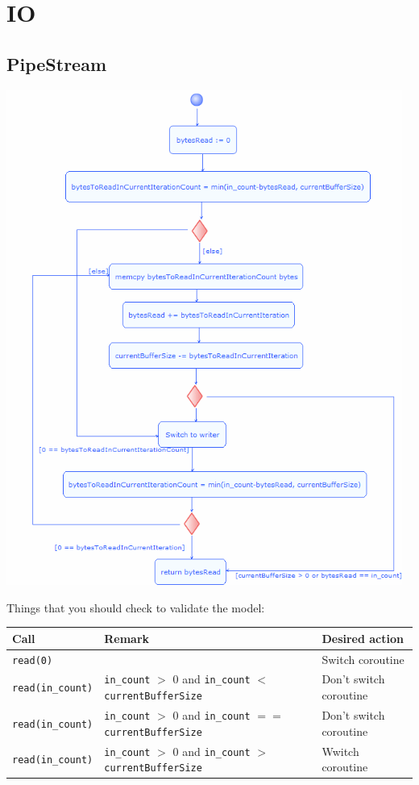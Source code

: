 \documentclass[10pt]{scrbook}
\begin{document}
\section{IO}

\subsection{PipeStream}

\includegraphics[width=130mm]{uml/PipeStream_read_activity.png}

Things that you should check to validate the model:

\begin{tabular}{| l | l | l |}
\hline
Call & Remark & Desired action \\
\hline
\hline
  \texttt{read(0)} & & Switch coroutine \\
\hline
  \texttt{read(in\_count)} & \texttt{in\_count} $>$ 0 and \texttt{in\_count} $<$ \texttt{currentBufferSize} & Don't switch coroutine \\
\hline
  \texttt{read(in\_count)} & \texttt{in\_count} $>$ 0 and \texttt{in\_count} $==$ \texttt{currentBufferSize} & Don't switch coroutine \\
\hline
  \texttt{read(in\_count)} & \texttt{in\_count} $>$ 0 and \texttt{in\_count} $>$ \texttt{currentBufferSize} & Wwitch coroutine \\
\hline
\end{tabular}
\end{document}
